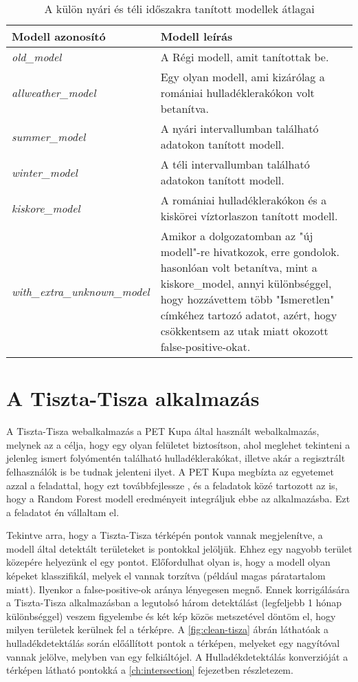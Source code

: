 \begin{table}[H]
	\centering
	\begin{tabular}{ | p{} | p{} | }
		\hline
		\textbf{Modell azonosító} & \textbf{Modell leírás} \\
		\hline \hline
		\emph{old\_model} & A Régi modell, amit \citeauthor{magyar2023} tanítottak be.  \\
		\hline
		\emph{allweather\_model} & Egy olyan modell, ami kizárólag a romániai hulladéklerakókon volt betanítva. \\
		\hline
		\emph{summer\_model} & A nyári intervallumban található adatokon tanított modell.  \\
		\hline
        \emph{winter\_model} & A téli intervallumban található adatokon tanított modell. \\
        \hline
        \emph{kiskore\_model} & A romániai hulladéklerakókon és a kiskörei víztorlaszon tanított modell. \\
		\hline
        \emph{with\_extra\_unknown\_model} & Amikor a dolgozatomban az "új modell"-re hivatkozok, erre gondolok. hasonlóan volt betanítva, mint a kiskore\_model, annyi különbséggel, hogy hozzávettem több "Ismeretlen" címkéhez tartozó adatot, azért, hogy csökkentsem az utak miatt okozott false-positive-okat. \\
		\hline
	\end{tabular}
	\caption{A külön nyári és téli időszakra tanított modellek átlagai}
	\label{tab:model-ids}
\end{table}

\section{A Tiszta-Tisza alkalmazás}

A Tiszta-Tisza webalkalmazás a PET Kupa által használt webalkalmazás, melynek az a célja, hogy egy olyan felületet biztosítson, ahol meglehet tekinteni a jelenleg ismert folyómentén található hulladéklerakókat, illetve akár a regisztrált felhasználók is be tudnak jelenteni ilyet. A PET Kupa megbízta az egyetemet azzal a feladattal, hogy ezt továbbfejlessze , és a feladatok közé tartozott az is, hogy a Random Forest modell eredményeit integráljuk ebbe az alkalmazásba. Ezt a feladatot én vállaltam el.

Tekintve arra, hogy a Tiszta-Tisza térképén pontok vannak megjelenítve, a modell által detektált területeket is pontokkal jelöljük. Ehhez egy nagyobb terület közepére helyezünk el egy pontot. Előfordulhat olyan is, hogy a modell olyan képeket klasszifikál, melyek el vannak torzítva (például magas páratartalom miatt). Ilyenkor a false-positive-ok aránya lényegesen megnő. Ennek korrigálására a Tiszta-Tisza alkalmazásban a legutolsó három detektálást (legfeljebb 1 hónap különbséggel) veszem figyelembe és két kép közös metszetével döntöm el, hogy milyen területek kerülnek fel a térképre. A \ref{fig:clean-tisza} ábrán láthatóak a hulladékdetektálás során előállított pontok a térképen, melyeket egy nagyítóval vannak jelölve, melyben van egy felkiáltójel. A Hulladékdetektálás konverzióját a térképen látható pontokká a \ref{ch:intersection} fejezetben részletezem.

